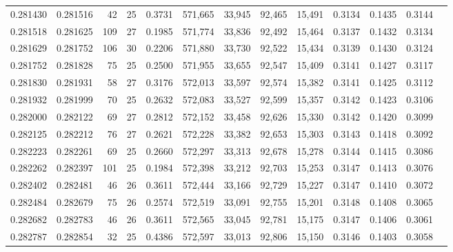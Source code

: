 \begin{tabular}{rrrrrrrrrrrrr}
0.281430 & 0.281516 &  42 &  25 &                                     0.3731 & 571,665 &  33,945 &  92,465 &  15,491 & 0.3134 & 0.1435 & 0.3144 \\
0.281518 & 0.281625 & 109 &  27 &                                     0.1985 & 571,774 &  33,836 &  92,492 &  15,464 & 0.3137 & 0.1432 & 0.3134 \\
0.281629 & 0.281752 & 106 &  30 &                                     0.2206 & 571,880 &  33,730 &  92,522 &  15,434 & 0.3139 & 0.1430 & 0.3124 \\
0.281752 & 0.281828 &  75 &  25 &                                     0.2500 & 571,955 &  33,655 &  92,547 &  15,409 & 0.3141 & 0.1427 & 0.3117 \\
0.281830 & 0.281931 &  58 &  27 &                                     0.3176 & 572,013 &  33,597 &  92,574 &  15,382 & 0.3141 & 0.1425 & 0.3112 \\
0.281932 & 0.281999 &  70 &  25 &                                     0.2632 & 572,083 &  33,527 &  92,599 &  15,357 & 0.3142 & 0.1423 & 0.3106 \\
0.282000 & 0.282122 &  69 &  27 &                                     0.2812 & 572,152 &  33,458 &  92,626 &  15,330 & 0.3142 & 0.1420 & 0.3099 \\
0.282125 & 0.282212 &  76 &  27 &                                     0.2621 & 572,228 &  33,382 &  92,653 &  15,303 & 0.3143 & 0.1418 & 0.3092 \\
0.282223 & 0.282261 &  69 &  25 &                                     0.2660 & 572,297 &  33,313 &  92,678 &  15,278 & 0.3144 & 0.1415 & 0.3086 \\
0.282262 & 0.282397 & 101 &  25 &                                     0.1984 & 572,398 &  33,212 &  92,703 &  15,253 & 0.3147 & 0.1413 & 0.3076 \\
0.282402 & 0.282481 &  46 &  26 &                                     0.3611 & 572,444 &  33,166 &  92,729 &  15,227 & 0.3147 & 0.1410 & 0.3072 \\
0.282484 & 0.282679 &  75 &  26 &                                     0.2574 & 572,519 &  33,091 &  92,755 &  15,201 & 0.3148 & 0.1408 & 0.3065 \\
0.282682 & 0.282783 &  46 &  26 &                                     0.3611 & 572,565 &  33,045 &  92,781 &  15,175 & 0.3147 & 0.1406 & 0.3061 \\
0.282787 & 0.282854 &  32 &  25 &                                     0.4386 & 572,597 &  33,013 &  92,806 &  15,150 & 0.3146 & 0.1403 & 0.3058 \\

\end{tabular}
